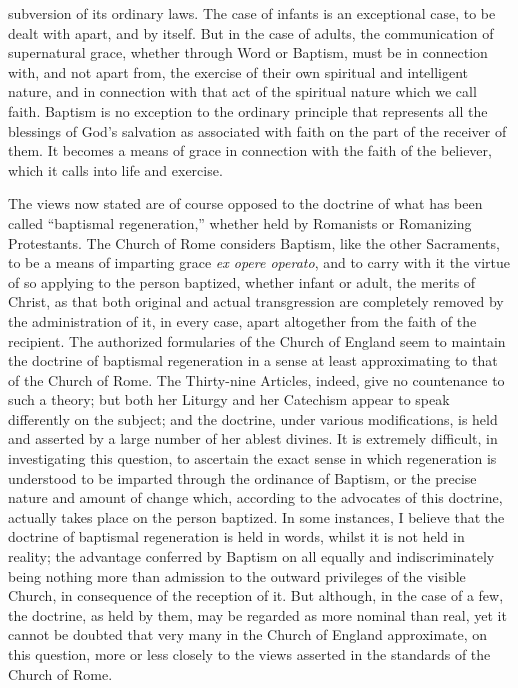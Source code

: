 \documentclass[english,]{book}
\begin{document}
subversion of its ordinary laws. The case of infants is an exceptional case, to be dealt with apart, and by itself. But in the case of adults, the communication of supernatural grace, whether through Word or Baptism, must be in connection with, and not apart from, the exercise of their own spiritual and intelligent nature, and in connection with that act of the spiritual nature which we call faith. Baptism is no exception to the ordinary principle that represents all the blessings of God's salvation as associated with faith on the part of the receiver of them. It becomes a means of grace in connection with the faith of the believer, which it calls into life and exercise.

The views now stated are of course opposed to the doctrine of what has been called ``baptismal regeneration,'' whether held by Romanists or Romanizing Protestants. The Church of Rome considers Baptism, like the other Sacraments, to be a means of imparting grace \emph{ex opere operato}, and to carry with it the virtue of so applying to the person baptized, whether infant or adult, the merits of Christ, as that both original and actual transgression are completely removed by the administration of it, in every case, apart altogether from the faith of the recipient. The authorized formularies of the Church of England seem to maintain the doctrine of baptismal regeneration in a sense at least approximating to that of the Church of Rome. The Thirty-nine Articles, indeed, give no countenance to such a theory; but both her Liturgy and her Catechism appear to speak differently on the subject; and the doctrine, under various modifications, is held and asserted by a large number of her ablest divines. It is extremely difficult, in investigating this question, to ascertain the exact sense in which regeneration is understood to be imparted through the ordinance of Baptism, or the precise nature and amount of change which, according to the advocates of this doctrine, actually takes place on the person baptized. In some instances, I believe that the doctrine of baptismal regeneration is held in words, whilst it is not held in reality; the advantage conferred by Baptism on all equally and indiscriminately being nothing more than admission to the outward privileges of the visible Church, in consequence of the reception of it. But although, in the case of a few, the doctrine, as held by them, may be regarded as more nominal than real, yet it cannot be doubted that very many in the Church of England approximate, on this question, more or less closely to the views asserted in the standards of the Church of Rome.
\end{document}
